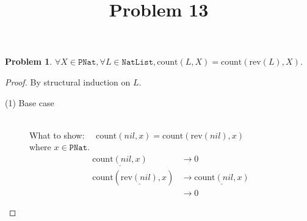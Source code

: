 \documentclass[12pt, a4paper]{article}
\title{Problem 13}
\date{\vspace{-5ex}}
\newtheorem{problem}{Problem}
\newcommand{\rmx}[1]{\mathrm{#1}}
\newcommand{\larrow}{\longrightarrow}
\newcommand{\under}{\underline}
\begin{document}
\maketitle

\begin{problem}
$\forall X \in \mathtt{PNat}, \forall L \in \mathtt{NatList}, \rmx{count}(L, X) = \rmx{count}(\rmx{rev}(L), X)$.
\end{problem}
\begin{proof}
By structural induction on $L$.
\begin{description}
\item[(1) Base case]~\\
\noindent
What to show: $\quad \rmx{count}(nil, x) = \rmx{count}(\rmx{rev}(nil), x)$\\
where $x \in \mathtt{PNat}$.
\begin{align*}
\under{\rmx{count}(nil, x)} 
	&\larrow 0 \tag{by cnt1} \\
\rmx{count}(\under{\rmx{rev}(nil)}, x)
	&\larrow \under{\rmx{count}(nil, x)} \tag{by rev1} \\
	&\larrow 0 \tag{by cnt1}
\end{align*}


\end{description}
\end{proof}
\end{document}
